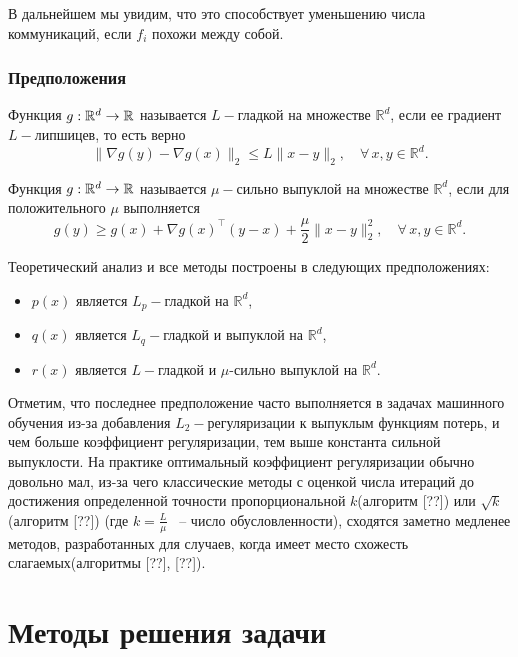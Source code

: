 \documentclass[a4paper,12pt]{extarticle}
\newcommand{\norm}[1]{\|#1\|_{2}}
\newcommand{\sqn}[1]{\norm{#1}^2}
\begin{document}
В дальнейшем мы увидим, что это способствует уменьшению числа коммуникаций, если $f_i$ похожи между собой.


\subsubsection*{Предположения}
Функция $g:\mathbb{R}^d\to\mathbb{R}$ называется $L-$гладкой на множестве $\mathbb{R}^d$, если ее градиент $L-$липшицев,
то есть верно
\begin{equation}
    \label{eqn:strong_convex}
    \norm{\nabla g(y) - \nabla g(x)} \leq L \norm{x - y}, \quad \forall\, x, y \in \mathbb{R}^d.
\end{equation}



Функция $g:\mathbb{R}^d\to\mathbb{R}$ называется $\mu-$сильно выпуклой на множестве $\mathbb{R}^d$,
если для положительного $\mu$ выполняется
\begin{equation}
    \label{eqn:strong_convex}
    g(y) \geq g(x) + \nabla g(x)^\top(y - x) + \frac{\mu}{2}\sqn{x - y}, \quad \forall\, x, y \in \mathbb{R}^d.
\end{equation}

Теоретический анализ и все методы построены в следующих предположениях: 

\begin{itemize}
    \item $p(x)$ является $L_p-$гладкой на $\mathbb{R}^d$,
    \item $q(x)$ является $L_q-$гладкой и выпуклой на $\mathbb{R}^d$, 
    \item $r(x)$ является $L-$гладкой и $\mu$-сильно выпуклой на $\mathbb{R}^d$.
\end{itemize}

Отметим, что последнее предположение часто выполняется в задачах машинного обучения из-за добавления
$L_2-$регуляризации к выпуклым функциям потерь, и чем больше коэффициент регуляризации, тем выше константа
сильной выпуклости. На практике оптимальный коэффициент регуляризации обычно довольно мал, из-за 
чего классические методы с оценкой числа итераций до достижения определенной точности
пропорциональной $k$(алгоритм [??]) или $\sqrt{k}$(алгоритм [??]) (где $k = \frac{L}{\mu}$ ~-- число обусловленности),
сходятся заметно медленее методов, разработанных для случаев, когда имеет место схожесть слагаемых(алгоритмы [??], [??]).




\section{Методы решения задачи}
\end{document}

